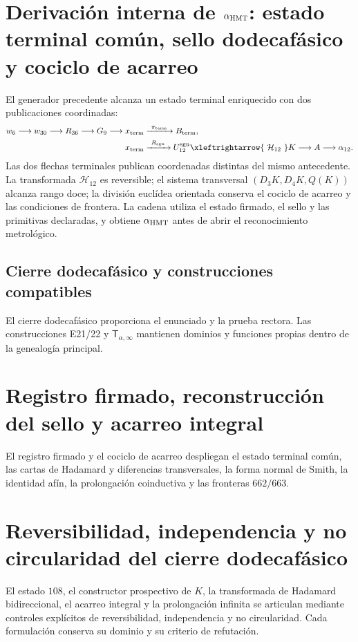 \label{chap:p3-83-25-alpha}

\section[Derivación interna de \texorpdfstring{\(\alpha_{\rm HMT}\)}{alpha HMT}]
{Derivación interna de \texorpdfstring{\(\alpha_{\rm HMT}\)}{alpha HMT}:
estado terminal común, sello dodecafásico y cociclo de acarreo}
\label{p3-83-c25-s1:chap:parte-iii-alpha-hmt}

El generador precedente alcanza un estado terminal enriquecido con dos
publicaciones coordinadas:
\[
\begin{aligned}
w_6\longrightarrow w_{30}\longrightarrow R_{36}\longrightarrow G_9
\longrightarrow x_{\rm term}
&\xrightarrow{\ \pi_{\rm term}\ }B_{\rm term},\\
x_{\rm term}
&\xrightarrow{\ R_{\rm sgn}\ }U_{12}^{\rm sgn}
\xleftrightarrow{\ \mathcal H_{12}\ }K
\longrightarrow A\longrightarrow\alpha_{12}.
\end{aligned}
\]
Las dos flechas terminales publican coordenadas distintas del mismo antecedente.
La transformada \(\mathcal H_{12}\) es reversible; el sistema transversal
\((D_3K,D_4K,Q(K))\) alcanza rango doce; la división euclídea orientada conserva
el cociclo de acarreo y las condiciones de frontera. La cadena utiliza el
estado firmado, el sello y las primitivas declaradas, y obtiene
\(\alpha_{\rm HMT}\) antes de abrir el reconocimiento metrológico.

\subsection{Cierre dodecafásico y construcciones compatibles}
El cierre dodecafásico proporciona el enunciado y la prueba rectora. Las
construcciones E21/22 y \(\mathsf T_{\alpha,\infty}\) mantienen dominios y
funciones propias dentro de la genealogía principal.


\section{Registro firmado, reconstrucción del sello y acarreo integral}
El registro firmado y el cociclo de acarreo despliegan el estado terminal
común, las cartas de Hadamard y diferencias transversales, la forma normal de
Smith, la identidad afín, la prolongación coinductiva y las fronteras
\(662/663\).


\section{Reversibilidad, independencia y no circularidad del cierre dodecafásico}
El estado \(108\), el constructor prospectivo de \(K\), la transformada de
Hadamard bidireccional, el acarreo integral y la prolongación infinita se
articulan mediante controles explícitos de reversibilidad, independencia y no
circularidad. Cada formulación conserva su dominio y su criterio de
refutación.


